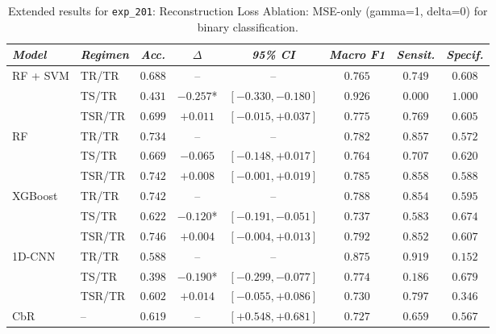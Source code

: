 \begin{table}[H]
\centering
\scriptsize
\caption{Extended results for \texttt{exp\_201}: Reconstruction Loss Ablation: MSE-only (gamma=1, delta=0) for binary classification.}
\label{tab:appendix_exp_201}
\begin{tabular*}{\textwidth}{@{\extracolsep{\fill}}llcccccc}
\toprule
\emph{Model} & \emph{Regimen} & \emph{Acc.} & \emph{$\Delta$} & \emph{95\% CI} & \emph{Macro F1} & \emph{Sensit.} & \emph{Specif.}\\
\midrule
\multirow{3}{*}{RF + SVM} & TR/TR & $0.688$ & -- & -- & $0.765$ & $0.749$ & $0.608$\\
 & TS/TR & $0.431$ & $-0.257$* & $[-0.330, -0.180]$ & $0.926$ & $0.000$ & $1.000$\\
 & TSR/TR & $0.699$ & $+0.011$ & $[-0.015, +0.037]$ & $0.775$ & $0.769$ & $0.605$\\
\midrule
\multirow{3}{*}{RF} & TR/TR & $0.734$ & -- & -- & $0.782$ & $0.857$ & $0.572$\\
 & TS/TR & $0.669$ & $-0.065$ & $[-0.148, +0.017]$ & $0.764$ & $0.707$ & $0.620$\\
 & TSR/TR & $0.742$ & $+0.008$ & $[-0.001, +0.019]$ & $0.785$ & $0.858$ & $0.588$\\
\midrule
\multirow{3}{*}{XGBoost} & TR/TR & $0.742$ & -- & -- & $0.788$ & $0.854$ & $0.595$\\
 & TS/TR & $0.622$ & $-0.120$* & $[-0.191, -0.051]$ & $0.737$ & $0.583$ & $0.674$\\
 & TSR/TR & $0.746$ & $+0.004$ & $[-0.004, +0.013]$ & $0.792$ & $0.852$ & $0.607$\\
\midrule
\multirow{3}{*}{1D-CNN} & TR/TR & $0.588$ & -- & -- & $0.875$ & $0.919$ & $0.152$\\
 & TS/TR & $0.398$ & $-0.190$* & $[-0.299, -0.077]$ & $0.774$ & $0.186$ & $0.679$\\
 & TSR/TR & $0.602$ & $+0.014$ & $[-0.055, +0.086]$ & $0.730$ & $0.797$ & $0.346$\\
\midrule
CbR & -- & $0.619$ & -- & $[+0.548, +0.681]$ & $0.727$ & $0.659$ & $0.567$\\
\bottomrule
\end{tabular*}
\end{table}

